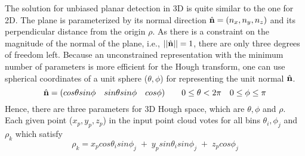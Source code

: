 The solution for unbiased planar detection in 3D is quite similar to the one for 2D.
The plane is parameterized by its normal direction $\hat{\bf n} = (n_x, n_y, n_z)$ and
its perpendicular distance from the origin $\rho$. 
As there is a constraint on the magnitude of the normal of the plane,
i.e., $||\hat{\bf n}|| = 1$, there are only three degrees of freedom left. 
Because an unconstrained representation with the minimum number of 
parameters is more efficient for the Hough transform, 
one can use spherical coordinates of a unit sphere ($\theta, \phi$) 
for representing the unit normal $\hat{\bf n}$.
\begin{equation}
\hat{\bf n} = (cos\theta sin\phi  \quad sin\theta sin\phi \quad cos\phi) 
\qquad 0 \le \theta < 2\pi \quad 
0 \le \phi \le \pi
\end{equation}
Hence, there are three parameters for 3D Hough space, which are $\theta, \phi$ and $\rho$. 
Each given point ($x_p, y_p, z_p$) in the input point cloud votes for all bins 
$\theta_i, \phi_j $ and $\rho_k$ which satisfy
\begin{equation}
\rho_k = x_pcos\theta_i sin\phi_j \; + \; y_psin\theta_isin\phi_j \; + \; z_pcos\phi_j
\label{eq:ht_plane}
\end{equation}

